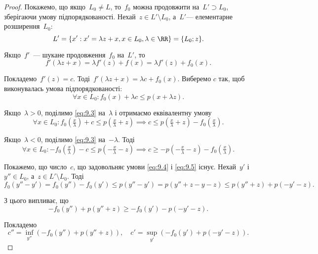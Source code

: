 \begin{proof}
Покажемо, що якщо~$L_0 \ne L$, то~$f_0$ можна
продовжити на~$L' \supset L_0$, зберігаючи умову підпорядкованості.
Нехай~$z \in L' \setminus L_0$, а~$L'$--- елементарне розширення~$L_0$:
\begin{equation*}
    L' = \{x': x' = \lambda z + x, x \in L_0, \lambda \in \RR\} = \{L_0; z\}.
\end{equation*}

Якщо~$f'$~--- шукане продовження~$f_0$ на~$L'$, то
\begin{equation*}
    f'(\lambda z + x) = \lambda f'(z) + f(x) = \lambda f'(z) + f_0(x).
\end{equation*}

Покладемо~$f'(z) = c$. Тоді~$f'(\lambda z + x) = \lambda c + f_0(x)$. Виберемо
$c$ так, щоб виконувалась умова підпорядкованості:
\begin{equation}
    \label{eq:9.3}
    \forall x \in L_0: f_0(x) + \lambda c \le p(x + \lambda z).
\end{equation}

Якщо~$\lambda > 0$, поділимо \eqref{eq:9.3} на~$\lambda$ і отримаємо еквівалентну
умову
\begin{equation}
    \label{eq:9.4}
    \forall x \in L_0: f_0(\tfrac{x}{\lambda}) + c \le p(\tfrac{x}{\lambda} + z) \implies
    c \le p(\tfrac{x}{\lambda} + z) - f_0(\tfrac{x}{\lambda}).
\end{equation}

Якщо~$\lambda < 0$, поділимо \eqref{eq:9.3} на~$-\lambda$. Тоді
\begin{equation}
    \label{eq:9.5}
    \forall x \in L_0: -f_0(\tfrac{x}{\lambda}) - c \le p(-\tfrac{x}{\lambda} - z) \implies
    c \ge -p(-\tfrac{x}{\lambda} - z) - f_0(\tfrac{x}{\lambda}).
\end{equation}

Покажемо, що число~$c$, що задовольняє умови \eqref{eq:9.4} і \eqref{eq:9.5} існує.
Нехай~$y'$ і~$y'' \in L_0$, а~$z \in L' \setminus L_0$. Тоді
\begin{equation*}
    f_0(y'' - y') = f_0(y'') - f_0(y') \le p(y'' - y') =
    p(y'' + z - y - z) \le p(y'' + z) + p(-y' - z).
\end{equation*}

З цього випливає, що
\begin{equation*}
    -f_0(y'') + p(y'' + z) \ge -f_0(y') - p(-y' - z).
\end{equation*}

Покладемо
\begin{equation*}
    c'' = \inf_{y''} (-f_0(y'') + p(y'' + z)), \quad c' = \sup_{y'} (-f_0(y') + p(-y' - z)). 
\end{equation*}


\end{proof}
